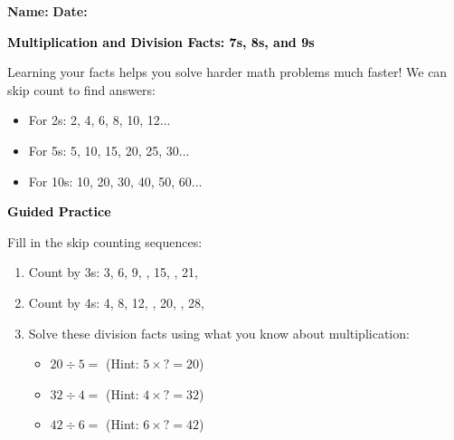 \documentclass[12pt, letterpaper, fleqn]{article}
\newcommand{\blank}{\underline{\hspace{2.2cm}}}
\begin{document}
\textbf{Name:} \underline{\hspace{5cm}}
\hfill
\textbf{Date:} \underline{\hspace{3cm}}\\

\begin{tcolorbox}[colback=customteal!20]
    \large\textcolor{black}{\textbf{Multiplication and Division Facts: 7s, 8s, and 9s}}
\end{tcolorbox}

\vspace{3mm}
\noindent
Learning your facts helps you solve harder math problems much faster!
We can skip count to find answers:
\begin{itemize}
  \item For 2s: 2, 4, 6, 8, 10, 12...
  \item For 5s: 5, 10, 15, 20, 25, 30...
  \item For 10s: 10, 20, 30, 40, 50, 60...
\end{itemize}

\newpage
\begin{tcolorbox}[colback=customteal!20]
    \large\textcolor{black}{\textbf{Guided Practice}}
\end{tcolorbox}

\vspace{5mm}
\noindent
Fill in the skip counting sequences:

\vspace{5mm}
\begin{enumerate}[itemsep=2cm, leftmargin=0.6cm]
\item Count by 3s: 3, 6, 9, \blank, 15, \blank, 21, \blank
\item Count by 4s: 4, 8, 12, \blank, 20, \blank, 28, \blank
\item Solve these division facts using what you know about multiplication:
\begin{itemize}[itemsep=0.8cm]
  \item $20 \div 5 =$ \blank \quad (Hint: $5 \times \textsf{?} = 20$)
  \item $32 \div 4 =$ \blank \quad (Hint: $4 \times \textsf{?} = 32$)
  \item $42 \div 6 =$ \blank \quad (Hint: $6 \times \textsf{?} = 42$)
\end{itemize}
\end{enumerate}
\end{document}
